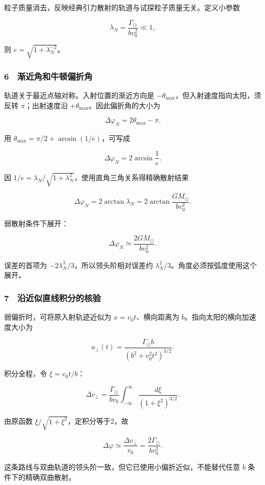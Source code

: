 \documentclass[12pt,a4paper,fontset=fandol]{ctexart}
\begin{document}
粒子质量消去，反映经典引力散射的轨道与试探粒子质量无关。定义小参数

\[\lambda_N=\frac{\Gamma_\odot}{bv_0^2}\ll1,\]

则 \(e=\sqrt{1+\lambda_N^{-2}}\)。

\subsubsection{6　渐近角和牛顿偏折角}\label{ux6e10ux8fd1ux89d2ux548cux725bux987fux504fux6298ux89d2}

轨道关于最近点轴对称。入射位置的渐近方向是
\(-\theta_{\max}\)，但入射速度指向太阳，须反转 \(\pi\)；出射速度沿
\(+\theta_{\max}\)。因此偏折角的大小为

\[\boxed{\Delta\varphi_N=2\theta_{\max}-\pi.}\]

用 \(\theta_{\max}=\pi/2+\arcsin(1/e)\)，可写成

\[\Delta\varphi_N=2\arcsin\frac1e.\]

因
\(1/e=\lambda_N/\sqrt{1+\lambda_N^2}\)，使用直角三角关系得精确散射结果

\[\boxed{\Delta\varphi_N=2\arctan\lambda_N
=2\arctan\frac{GM_\odot}{bv_0^2}.}\]

弱散射条件下展开：

\[\boxed{\Delta\varphi_N
\simeq\frac{2GM_\odot}{bv_0^2}.}\]

误差的首项为 \(-2\lambda_N^3/3\)，所以领头阶相对误差约
\(\lambda_N^2/3\)。角度必须按弧度使用这个展开。

\subsubsection{7　沿近似直线积分的核验}\label{ux6cbfux8fd1ux4f3cux76f4ux7ebfux79efux5206ux7684ux6838ux9a8c}

弱偏折时，可将原入射轨迹近似为 \(x=v_0t\)、横向距离为
\(b\)。指向太阳的横向加速度大小为

\[a_\perp(t)=\frac{\Gamma_\odot b}{(b^2+v_0^2t^2)^{3/2}}.\]

积分全程，令 \(\xi=v_0t/b\)：

\[\Delta v_\perp
=\frac{\Gamma_\odot}{bv_0}
\int_{-\infty}^{\infty}\frac{d\xi}{(1+\xi^2)^{3/2}}.\]

由原函数 \(\xi/\sqrt{1+\xi^2}\)，定积分等于2，故

\[\Delta\varphi\simeq\frac{\Delta v_\perp}{v_0}
=\frac{2\Gamma_\odot}{bv_0^2}.\]

这条路线与双曲轨道的领头阶一致，但它已使用小偏折近似，不能替代任意 \(b\)
条件下的精确双曲散射。
\end{document}
